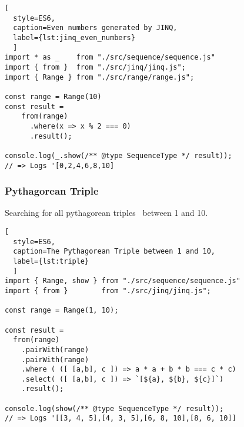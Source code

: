 \begin{lstlisting}[
  style=ES6, 
  caption=Even numbers generated by JINQ,
  label={lst:jinq_even_numbers}
  ]
import * as _    from "./src/sequence/sequence.js"
import { from }  from "./src/jinq/jinq.js";
import { Range } from "./src/range/range.js";

const range = Range(10)
const result =
    from(range)
      .where(x => x % 2 === 0)
      .result();

console.log(_.show(/** @type SequenceType */ result));
// => Logs '[0,2,4,6,8,10]
\end{lstlisting}

\subsubsection{Pythagorean Triple}
\label{subsub:JINQ_Pythagorean Triple}
Searching for all pythagorean triples~\cite{pythagorean_triple} between 1 and 10.

\begin{lstlisting}[
  style=ES6, 
  caption=The Pythagorean Triple between 1 and 10,
  label={lst:triple}
  ]
import { Range, show } from "./src/sequence/sequence.js"
import { from }        from "./src/jinq/jinq.js";

const range = Range(1, 10);

const result =
  from(range)
    .pairWith(range)
    .pairWith(range)
    .where ( ([ [a,b], c ]) => a * a + b * b === c * c)
    .select( ([ [a,b], c ]) => `[${a}, ${b}, ${c}]`)
    .result();

console.log(show(/** @type SequenceType */ result));
// => Logs '[[3, 4, 5],[4, 3, 5],[6, 8, 10],[8, 6, 10]]
\end{lstlisting}
